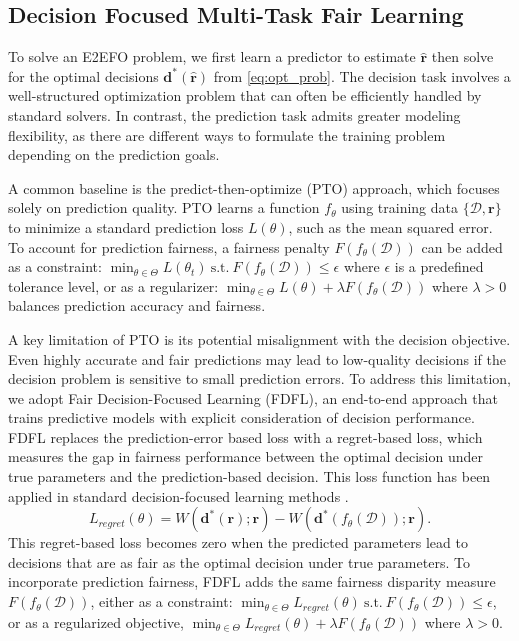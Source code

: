 \documentclass[ijoc,sglanonrev]{informs4}
\begin{document}
\subsection{Decision Focused Multi-Task Fair Learning} \label{sec:FDFL-framework}
To solve an E2EFO problem, we 
first learn a predictor to estimate $\hat{\mathbf{r}}$ then solve for the optimal decisions $\mathbf{d}^*(\hat{\mathbf{r}})$ from \eqref{eq:opt_prob}. 
The decision task involves a well-structured optimization problem that can often be efficiently handled by standard solvers. In contrast, the prediction task admits greater modeling flexibility, as there are different ways to formulate the training problem depending on the prediction goals. 

A common baseline is the predict-then-optimize (PTO) approach, which focuses solely on prediction quality. PTO learns a function $f_{\theta}$ using training data $\{\mathcal{D},\mathbf{r}\}$ to minimize a standard prediction loss $L(\theta)$, such as the mean squared error. To account for prediction fairness, a fairness penalty $F(f_{\theta}(\mathcal{D}))$ can be added as a constraint: $\min_{\theta \in \Theta} L(\theta_t) ~ \text{s.t.} ~ F(f_{\theta}(\mathcal{D})) \leq \epsilon$ where $\epsilon$ is a predefined tolerance level, or as a regularizer: $\min_{\theta \in \Theta} L(\theta) + \lambda F(f_{\theta}(\mathcal{D}))$ where $\lambda > 0$ balances prediction accuracy and fairness. 

A key limitation of PTO is its potential misalignment with the decision objective. Even highly accurate and fair predictions may lead to low-quality decisions if the decision problem is sensitive to small prediction errors. To address this limitation, we adopt Fair Decision-Focused Learning (FDFL), an end-to-end approach that trains predictive models with explicit consideration of decision performance. 
FDFL replaces the prediction-error based loss with a regret-based loss, which measures the gap in fairness performance between the optimal decision under true parameters and the prediction-based decision. This loss function has been applied in standard decision-focused learning methods \citep{pyepo2023}. 
\begin{equation} \label{eq-def:regret}
    L_{regret}(\theta) = W(\mathbf{d^*}(\mathbf{r});\mathbf{r}) - W(\mathbf{d}^*(f_{\theta}(\mathcal{D}));\mathbf{r}).
\end{equation}
This regret-based loss becomes zero when the predicted parameters lead to decisions that are as fair as the optimal decision under true parameters. To incorporate prediction fairness, FDFL adds the same fairness disparity measure $F(f_\theta(\mathcal{D}))$, either as a constraint: $\min_{\theta \in \Theta} L_{regret}(\theta) ~ \text{s.t.} ~ F(f_{\theta}(\mathcal{D})) \leq \epsilon$, or as a regularized objective, $\min_{\theta \in \Theta} L_{regret}(\theta) + \lambda F(f_{\theta}(\mathcal{D}))$ where $\lambda > 0$.
\end{document}
